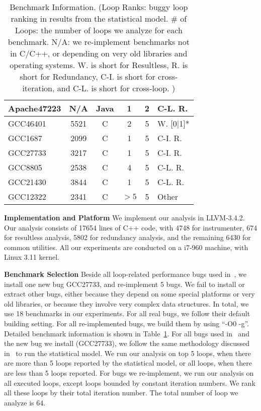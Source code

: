 \begin{table}
\begin{tabular}{lccccl}
   Apache47223      & N/A          & Java                   & 1               & 2               &  C-L. R. \\
   \midrule
   GCC46401         & 5521         & C                      & 2               &   5             &  W. [0$|$1]*   \\
   GCC1687          & 2099         & C                      & 1               &   5             &  C-I. R. \\
   GCC27733         & 3217         & C                      & 1               &   5             &  C-I. R. \\
   GCC8805          & 2538         & C                      & 4               &   5             &  C-L. R.\\
   GCC21430         & 3844         & C                      & 1               &   5             &  C-L. R. \\
   GCC12322         & 2341         & C                      & $>5$            &   5             &  Other\\
\bottomrule
   \end{tabular}
  \caption{Benchmark Information. (Loop Ranks: buggy loop ranking in results from the statistical model.
  \# of Loops: the number of loops we analyze for each benchmark. 
  N/A: we re-implement benchmarks not in C/C++, or depending on very old libraries and operating systems. 
  W. is short for Resultless, R. is short for Redundancy, C-I. is short for cross-iteration, and C-L. is short for cross-loop. )}
  \label{tab:benchmarks}
\end{table}

{\bf Implementation and Platform}
We implement our analysis in LLVM-3.4.2. 
Our analysis consists of 17654 lines of C++ code, 
with 4748 for instrumenter, 674 for resultless analysis, 
5802 for redundancy analysis, 
and the remaining 6430 for common utilities. 
All our experiments are conducted on a i7-960 machine, with Linux 3.11 kernel. 

{\bf Benchmark Selection}
Beside all loop-related performance bugs used in~\cite{SongOOPSLA2014}, 
we install one new bug GCC27733, and re-implement 5 bugs. 
We fail to install or extract other bugs, 
either because they depend on some special platforms or very old libraries, 
or because they involve very complex data structures. 
In total, we use 18 benchmarks in our experiments. 
For all real bugs, we follow their default building setting. For all re-implemented bugs,
we build them by using ``-O0 -g''. 
Detailed benchmark information is shown in Table~\ref{tab:benchmarks}. 
For all bugs used in~\cite{SongOOPSLA2014} and the new bug we install (GCC27733), 
we follow the same methodology discussed in~\cite{SongOOPSLA2014} to run the statistical model. 
We run our analysis on top 5 loops, 
when there are more than 5 loops reported by the statistical model, 
or all loops, when there are less than 5 loops reported. 
For bugs we re-implement, we run our analysis on all executed loops, 
except loops bounded by constant iteration numbers.
We rank all these loops by their total iteration number. 
The total number of loop we analyze is 64.   

